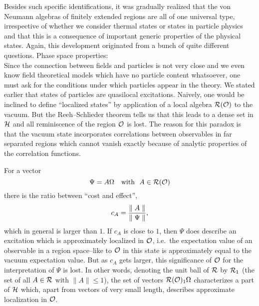 Besides such specific
identifications, it was gradually realized that the von Neumann
algebras of finitely extended regions are all of one universal type,
irrespective of whether we consider thermal states or states in
particle physics and that this is a consequence of important generic
properties of the physical states. Again, this development originated
from a bunch of quite different questions. \newpage
{\noindent \subsect Phase space properties:}\\[2mm]
Since the connection between fields and particles is not very close
and we even know field theoretical models which have
no particle content whatsoever, one must ask for the conditions under
which particles appear in the theory. We stated earlier that states of
particles are quasilocal excitations. Naively, one would be inclined to
define ``localized states'' by
application of a local algebra $\cal{R(O)}$ to the vacuum. But the
Reeh--Schlieder theorem tells us that this leads to a
dense set in $\cal H$ and all reminiscence of the region $\cal O$ is
lost. The reason for this paradox is that the vacuum state
incorporates correlations between observables in far separated regions
which cannot vanish exactly because of analytic properties of the
correlation functions. 

For a vector
\begin{equation}
\Psi = A {\Omega} \quad \mbox{with } \ A \in {\cal R}({\cal O})
\end{equation}
there is the ratio between ``cost and effect'', 
\begin{equation}
c_A = {{ \parallel A \parallel} \over {\parallel \Psi \parallel}},
\end{equation}
which in general is larger than $1$. If $c_A$ is close to $1$,  
then $\Psi$ does describe an excitation which
is approximately localized in $\cal O$, i.e.\ the 
expectation value of an observable in a region space--like to 
$\cal O$ in this state is approximately equal to the
vacuum expectation value. But as $c_A$ gets larger, this
significance of $\cal O$ for the interpretation of $\Psi$ is lost. In
other words, denoting the unit ball of $\cal R$ by ${\cal R}_1$
(the set of all $A \in \cal{R}$ with $\parallel A \parallel \le 1$), 
the set of vectors 
${\cal R}({\cal O})_1 {\Omega}$ characterizes a part of
$\cal H$ which, apart from vectors of very small length, describes
approximate localization in $\cal O$. 

